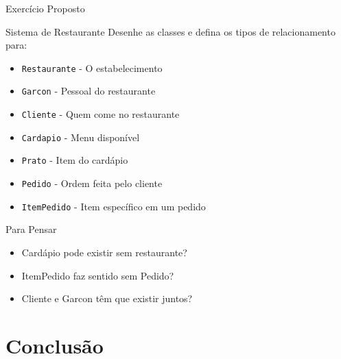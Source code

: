 \documentclass[aspectratio=169]{beamer}
\begin{document}
\begin{frame}{Exercício Proposto}
\begin{block}{Sistema de Restaurante}
Desenhe as classes e defina os tipos de relacionamento para:

\begin{itemize}
\item \texttt{Restaurante} - O estabelecimento
\item \texttt{Garcon} - Pessoal do restaurante
\item \texttt{Cliente} - Quem come no restaurante
\item \texttt{Cardapio} - Menu disponível
\item \texttt{Prato} - Item do cardápio
\item \texttt{Pedido} - Ordem feita pelo cliente
\item \texttt{ItemPedido} - Item específico em um pedido
\end{itemize}
\end{block}

\vspace{0.5cm}
\begin{exampleblock}{Para Pensar}
\begin{itemize}
\item Cardápio pode existir sem restaurante?
\item ItemPedido faz sentido sem Pedido?
\item Cliente e Garcon têm que existir juntos?
\end{itemize}
\end{exampleblock}
\end{frame}

\section{Conclusão}
\end{document}
